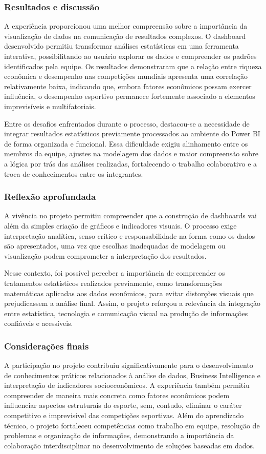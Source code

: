 \documentclass[12pt, a4paper, brazil]{article}
\begin{document}
\subsubsection{Resultados e discussão}
A experiência proporcionou uma melhor compreensão sobre a importância da visualização de dados na comunicação de resultados complexos. O dashboard desenvolvido permitiu transformar análises estatísticas em uma ferramenta interativa, possibilitando ao usuário explorar os dados e compreender os padrões identificados pela equipe. Os resultados demonstraram que a relação entre riqueza econômica e desempenho nas competições mundiais apresenta uma correlação relativamente baixa, indicando que, embora fatores econômicos possam exercer influência, o desempenho esportivo permanece fortemente associado a elementos imprevisíveis e multifatoriais. 

Entre os desafios enfrentados durante o processo, destacou-se a necessidade de integrar resultados estatísticos previamente processados ao ambiente do Power BI de forma organizada e funcional. Essa dificuldade exigiu alinhamento entre os membros da equipe, ajustes na modelagem dos dados e maior compreensão sobre a lógica por trás das análises realizadas, fortalecendo o trabalho colaborativo e a troca de conhecimentos entre os integrantes. 

\subsubsection{Reflexão aprofundada}
A vivência no projeto permitiu compreender que a construção de dashboards vai além da simples criação de gráficos e indicadores visuais. O processo exige interpretação analítica, senso crítico e responsabilidade na forma como os dados são apresentados, uma vez que escolhas inadequadas de modelagem ou visualização podem comprometer a interpretação dos resultados. 

Nesse contexto, foi possível perceber a importância de compreender os tratamentos estatísticos realizados previamente, como transformações matemáticas aplicadas aos dados econômicos, para evitar distorções visuais que prejudicassem a análise final. Assim, o projeto reforçou a relevância da integração entre estatística, tecnologia e comunicação visual na produção de informações confiáveis e acessíveis.

\subsubsection{Considerações finais}
A participação no projeto contribuiu significativamente para o desenvolvimento de conhecimentos práticos relacionados à análise de dados, Business Intelligence e interpretação de indicadores socioeconômicos. A experiência também permitiu compreender de maneira mais concreta como fatores econômicos podem influenciar aspectos estruturais do esporte, sem, contudo, eliminar o caráter competitivo e imprevisível das competições esportivas. Além do aprendizado técnico, o projeto fortaleceu competências como trabalho em equipe, resolução de problemas e organização de informações, demonstrando a importância da colaboração interdisciplinar no desenvolvimento de soluções baseadas em dados.
\end{document}
